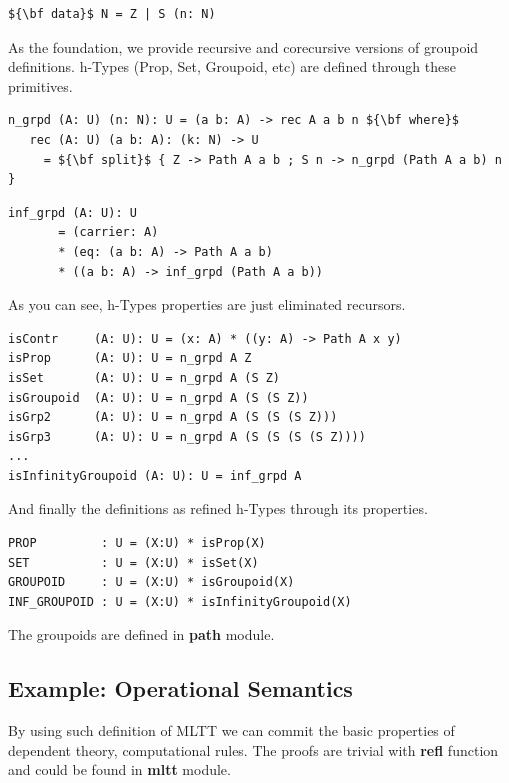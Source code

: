 \documentclass{article}
\begin{document}
\begin{lstlisting}[mathescape=true]
${\bf data}$ N = Z | S (n: N)
\end{lstlisting}

As the foundation, we provide recursive and corecursive versions of groupoid definitions.
h-Types \cite{HoTT} (Prop, Set, Groupoid, etc) are defined through these primitives.

\begin{lstlisting}[mathescape=true]
n_grpd (A: U) (n: N): U = (a b: A) -> rec A a b n ${\bf where}$
   rec (A: U) (a b: A): (k: N) -> U
     = ${\bf split}$ { Z -> Path A a b ; S n -> n_grpd (Path A a b) n }
\end{lstlisting}

\begin{lstlisting}
inf_grpd (A: U): U
       = (carrier: A)
       * (eq: (a b: A) -> Path A a b)
       * ((a b: A) -> inf_grpd (Path A a b))
\end{lstlisting}

As you can see, h-Types properties are just eliminated recursors.

\begin{lstlisting}[mathescape=true]
isContr     (A: U): U = (x: A) * ((y: A) -> Path A x y)
isProp      (A: U): U = n_grpd A Z
isSet       (A: U): U = n_grpd A (S Z)
isGroupoid  (A: U): U = n_grpd A (S (S Z))
isGrp2      (A: U): U = n_grpd A (S (S (S Z)))
isGrp3      (A: U): U = n_grpd A (S (S (S (S Z))))
...
isInfinityGroupoid (A: U): U = inf_grpd A
\end{lstlisting}

And finally the definitions as refined h-Types through its properties.

\begin{lstlisting}[mathescape=true]
PROP         : U = (X:U) * isProp(X)
SET          : U = (X:U) * isSet(X)
GROUPOID     : U = (X:U) * isGroupoid(X)
INF_GROUPOID : U = (X:U) * isInfinityGroupoid(X)
\end{lstlisting}

The groupoids are defined in {\bf path} module.

\subsection{Example: Operational Semantics}

By using such definition of MLTT we can commit the basic properties
of dependent theory, computational rules. The proofs are trivial
with {\bf refl} function and could be found in {\bf mltt} module.
\end{document}
